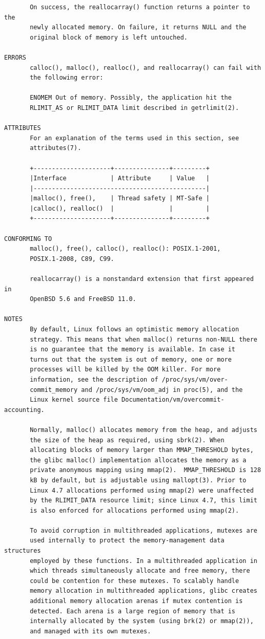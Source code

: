 {\begin{center}
\begin{verbatim}
       On success, the reallocarray() function returns a pointer to the
       newly allocated memory. On failure, it returns NULL and the
       original block of memory is left untouched.

ERRORS
       calloc(), malloc(), realloc(), and reallocarray() can fail with
       the following error:

       ENOMEM Out of memory. Possibly, the application hit the
       RLIMIT_AS or RLIMIT_DATA limit described in getrlimit(2).

ATTRIBUTES
       For an explanation of the terms used in this section, see
       attributes(7).

       +---------------------+---------------+---------+
       |Interface            | Attribute     | Value   |
       |-----------------------------------------------|
       |malloc(), free(),    | Thread safety | MT-Safe |
       |calloc(), realloc()  |               |         |
       +---------------------+---------------+---------+

CONFORMING TO
       malloc(), free(), calloc(), realloc(): POSIX.1-2001,
       POSIX.1-2008, C89, C99.

       reallocarray() is a nonstandard extension that first appeared in
       OpenBSD 5.6 and FreeBSD 11.0.

NOTES
       By default, Linux follows an optimistic memory allocation
       strategy. This means that when malloc() returns non-NULL there
       is no guarantee that the memory is available. In case it
       turns out that the system is out of memory, one or more
       processes will be killed by the OOM killer. For more
       information, see the description of /proc/sys/vm/over-    
       commit_memory and /proc/sys/vm/oom_adj in proc(5), and the
       Linux kernel source file Documentation/vm/overcommit-accounting.

       Normally, malloc() allocates memory from the heap, and adjusts
       the size of the heap as required, using sbrk(2). When
       allocating blocks of memory larger than MMAP_THRESHOLD bytes,
       the glibc malloc() implementation allocates the memory as a
       private anonymous mapping using mmap(2).  MMAP_THRESHOLD is 128
       kB by default, but is adjustable using mallopt(3). Prior to
       Linux 4.7 allocations performed using mmap(2) were unaffected
       by the RLIMIT_DATA resource limit; since Linux 4.7, this limit
       is also enforced for allocations performed using mmap(2). 

       To avoid corruption in multithreaded applications, mutexes are
       used internally to protect the memory-management data structures
       employed by these functions. In a multithreaded application in
       which threads simultaneously allocate and free memory, there
       could be contention for these mutexes. To scalably handle
       memory allocation in multithreaded applications, glibc creates
       additional memory allocation arenas if mutex contention is
       detected. Each arena is a large region of memory that is
       internally allocated by the system (using brk(2) or mmap(2)),
       and managed with its own mutexes. 


\end{verbatim}
\end{center}}
